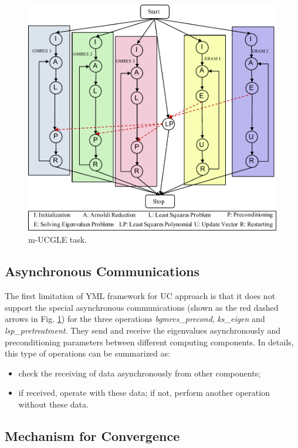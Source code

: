 \begin{figure}[t]
	\centering
	\includegraphics[width=0.8\linewidth]{fig/m-UCGLE-task2.pdf}
	\caption{m-UCGLE task.}
	\label{m-UCGLE-task}
\end{figure}

\subsection{Asynchronous Communications}

The first limitation of YML framework for UC approach is that it does not support the special asynchronous communications (shown as the red dashed arrows in Fig. \ref{m-UCGLE-task}) for the three operations \textit{bgmres\_precond}, \textit{ks\_eigen} and \textit{lsp\_pretreatment}. They send and receive the eigenvalues asynchronously and preconditioning parameters between different computing components. In details, this type of operations can be summarized as: 

\begin{itemize}
	\item check the receiving of data asynchronously from other components; 
	\item if received, operate with these data; if not, perform another operation without these data.
\end{itemize}

\subsection{Mechanism for Convergence}

